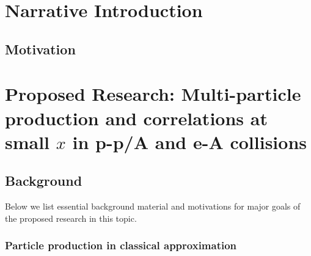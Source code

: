 \noindent

\section{Narrative Introduction}
    \label{sec:introduction}
    

    \vspace{0.5em}
    \subsection{Motivation}
        \label{sec:motivation}
        




\section{Proposed Research: Multi-particle production and correlations at small $x$ in p-p/A and 
e-A collisions}
    \label{sec:p1}

    \vspace{0.5em}
    \subsection{Background}
    \label{sec:p1b}

Below we list essential background material and motivations for major
goals of the proposed research in this topic. 

\subsubsection*{Particle production in classical approximation}
	
